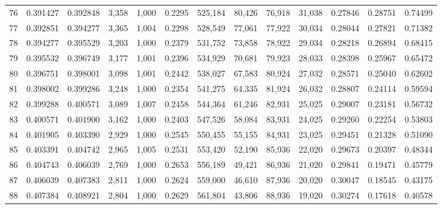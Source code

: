 \begin{tabular}{rrrrrrrrrrrrr}
76  &  0.391427 &  0.392848 &   3,358 &  1,000 &                                     0.2295 &  525,184 &   80,426 &   76,918 &   31,038 &  0.27846 &  0.28751 &  0.74499 \\
77  &  0.392851 &  0.394277 &   3,365 &  1,004 &                                     0.2298 &  528,549 &   77,061 &   77,922 &   30,034 &  0.28044 &  0.27821 &  0.71382 \\
78  &  0.394277 &  0.395529 &   3,203 &  1,000 &                                     0.2379 &  531,752 &   73,858 &   78,922 &   29,034 &  0.28218 &  0.26894 &  0.68415 \\
79  &  0.395532 &  0.396749 &   3,177 &  1,001 &                                     0.2396 &  534,929 &   70,681 &   79,923 &   28,033 &  0.28398 &  0.25967 &  0.65472 \\
80  &  0.396751 &  0.398001 &   3,098 &  1,001 &                                     0.2442 &  538,027 &   67,583 &   80,924 &   27,032 &  0.28571 &  0.25040 &  0.62602 \\
81  &  0.398002 &  0.399286 &   3,248 &  1,000 &                                     0.2354 &  541,275 &   64,335 &   81,924 &   26,032 &  0.28807 &  0.24114 &  0.59594 \\
82  &  0.399288 &  0.400571 &   3,089 &  1,007 &                                     0.2458 &  544,364 &   61,246 &   82,931 &   25,025 &  0.29007 &  0.23181 &  0.56732 \\
83  &  0.400571 &  0.401900 &   3,162 &  1,000 &                                     0.2403 &  547,526 &   58,084 &   83,931 &   24,025 &  0.29260 &  0.22254 &  0.53803 \\
84  &  0.401905 &  0.403390 &   2,929 &  1,000 &                                     0.2545 &  550,455 &   55,155 &   84,931 &   23,025 &  0.29451 &  0.21328 &  0.51090 \\
85  &  0.403391 &  0.404742 &   2,965 &  1,005 &                                     0.2531 &  553,420 &   52,190 &   85,936 &   22,020 &  0.29673 &  0.20397 &  0.48344 \\
86  &  0.404743 &  0.406039 &   2,769 &  1,000 &                                     0.2653 &  556,189 &   49,421 &   86,936 &   21,020 &  0.29841 &  0.19471 &  0.45779 \\
87  &  0.406039 &  0.407383 &   2,811 &  1,000 &                                     0.2624 &  559,000 &   46,610 &   87,936 &   20,020 &  0.30047 &  0.18545 &  0.43175 \\
88  &  0.407384 &  0.408921 &   2,804 &  1,000 &                                     0.2629 &  561,804 &   43,806 &   88,936 &   19,020 &  0.30274 &  0.17618 &  0.40578 \\

\end{tabular}
